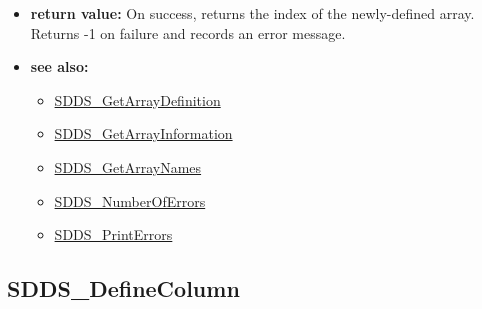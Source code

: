 \documentclass[11pt]{article}
\newcommand{\progref}[1]{\hyperref{SDDS_#1}{{\tt SDDS\_#1} (}{)}{SDDS_#1}}
\begin{document}
\begin{itemize}
\begin{itemize}
\end{itemize}
\item {\bf return value:}\newline
On success, returns the index of the newly-defined array. Returns -1 on failure and records an error message.
\item {\bf see also:}
\begin{itemize}
\item \progref{GetArrayDefinition}
\item \progref{GetArrayInformation}
\item \progref{GetArrayNames}
\item \progref{NumberOfErrors}
\item \progref{PrintErrors}
\end{itemize}
\end{itemize}

\subsection{SDDS\_DefineColumn}
\label{SDDS_DefineColumn}
\end{document}
